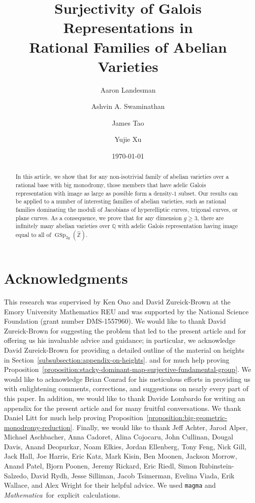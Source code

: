\documentclass[12 pt]{amsart}
\title[Surjectivity of Galois Representations in Families of Abelian Varieties]{Surjectivity of Galois Representations in \\ Rational Families of Abelian Varieties}
\date{\today}
\author[Aaron Landesman]{Aaron Landesman}
\author[Ashvin A. Swaminathan]{Ashvin A. Swaminathan}
\author[James Tao]{James Tao}
\author[Yujie Xu]{Yujie Xu}
\theoremstyle{plain}
\theoremstyle{definition}
\theoremstyle{definition}
\theoremstyle{remark}
\numberwithin{equation}{section}
\begin{document}
\begin{abstract}
	In this article, we show that for any non-isotrivial family of abelian varieties over a rational base with big monodromy, those members that have adelic Galois representation with image as large as possible form a density-$1$ subset. Our results can be applied to a number of interesting families of abelian varieties, such as rational families dominating the moduli of Jacobians of hyperelliptic curves, trigonal curves, or plane curves.
As a consequence, we prove that for any dimension $g \geq 3$, there are infinitely many abelian varieties over $\mathbb Q$ with adelic
Galois representation having image equal to all of $\operatorname{GSp}_{2g}(\widehat{\mathbb Z})$.
\end{abstract}


\maketitle






\appendix


\section*{Acknowledgments}

\noindent This research was supervised by Ken Ono and David Zureick-Brown at the Emory University Mathematics REU and was supported by the National Science Foundation (grant number DMS-1557960). We would like to thank David Zureick-Brown for suggesting the problem that led to the present article and for offering us his invaluable advice and guidance; in particular, we acknowledge David Zureick-Brown for providing a detailed outline of the material on heights in Section~\ref{subsubsection:appendix-on-heights}.
and for much help proving
Proposition~\ref{proposition:stacky-dominant-map-surjective-fundamental-group}. We would like to acknowledge Brian Conrad for his meticulous efforts in providing us with enlightening comments, corrections, and suggestions on nearly every part of this paper. In addition, we would like to thank Davide Lombardo for writing an appendix for the present article and for many fruitful conversations. 
We thank Daniel Litt for much help proving Proposition~\ref{proposition:big-geometric-monodromy-reduction}.
Finally, we would like to thank Jeff Achter, Jarod Alper, Michael Aschbacher, Anna Cadoret, Alina Cojocaru, John Cullinan, Dougal Davis, Anand Deopurkar, Noam Elkies, Jordan Ellenberg, Tony Feng, Nick Gill, Jack Hall, Joe Harris, Eric Katz, Mark Kisin, Ben Moonen, Jackson Morrow, Anand Patel, Bjorn Poonen, Jeremy Rickard, Eric Riedl, Simon Rubinstein-Salzedo, David Rydh, Jesse Silliman, Jacob Tsimerman, Evelina Viada, Erik Wallace, and Alex Wright for their helpful advice. We used {\tt magma} and \mbox{\emph{Mathematica} for explicit calculations.}



\end{document}
